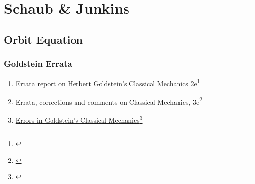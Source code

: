 % 


\section{Schaub \& Junkins}


\subsection{Orbit Equation}

\begin{frame}\frametitle{Goldstein Errata}
\begin{enumerate}
	\item \href{https://www.osti.gov/servlets/purl/6712863}{Errata report on Herbert Goldstein's Classical Mechanics 2e}\footnote{\cite{osti_6712863}}
	\item \href{http://astro.physics.sc.edu/goldstein/}{Errata, corrections and comments on Classical Mechanics, 3e}\footnote{\cite{goldstein3errata}}
	\item \href{https://pubs.aip.org/aapt/ajp/article-abstract/71/2/103/1055926/Errors-in-Goldstein-s-Classical-Mechanics?redirectedFrom=fulltext}{Errors in Goldstein’s Classical Mechanics}\footnote{\cite{tiersten2003errors}}
\end{enumerate}
\end{frame}

\endinput  %
